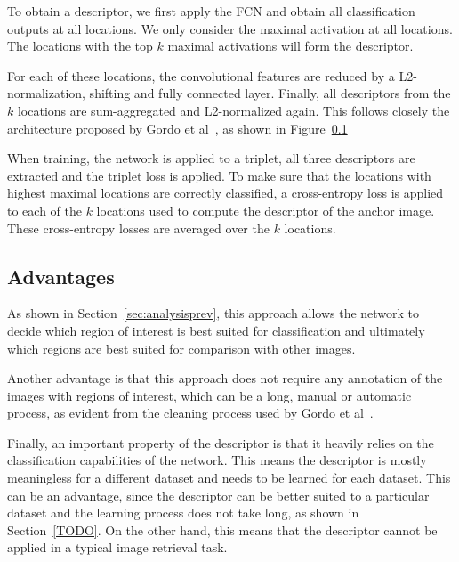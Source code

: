 To obtain a descriptor, we first apply the FCN and obtain all
classification outputs at all locations. We only consider the
maximal activation at all locations. The locations with the
top $k$ maximal activations will form the descriptor.

For each of these locations, the convolutional features are
reduced by a L2-normalization, shifting and fully connected
layer. Finally, all descriptors from the $k$ locations are
sum-aggregated and L2-normalized again. This follows closely
the architecture proposed by Gordo et al~\cite{}, as shown
in Figure~\ref{}%

When training, the network is applied to a triplet, all
three descriptors are extracted and the triplet loss is
applied. To make sure that the locations with highest
maximal locations are correctly classified, a
cross-entropy loss is applied to each of the $k$ locations
used to compute the descriptor of the anchor image.
These cross-entropy losses are averaged over the $k$
locations.

\subsection{Advantages}
As shown in Section~\ref{sec:analysisprev}, this approach
allows the network to decide which region of interest is
best suited for classification and ultimately which regions
are best suited for comparison with other images.

Another advantage is that this approach does not require
any annotation of the images with regions of interest,
which can be a long, manual or automatic process, as evident
from the cleaning process used by Gordo et al~\cite{}.

Finally, an important property of the descriptor is that it
heavily relies on the classification
capabilities of the network. This means the descriptor is
mostly meaningless for a different dataset and needs
to be learned for each dataset. This can be an advantage,
since the descriptor can be better suited to a particular
dataset and the learning process does not take long, as shown
in Section~\ref{TODO}. On the other hand, this means that
the descriptor cannot be applied in a typical image retrieval
task.


